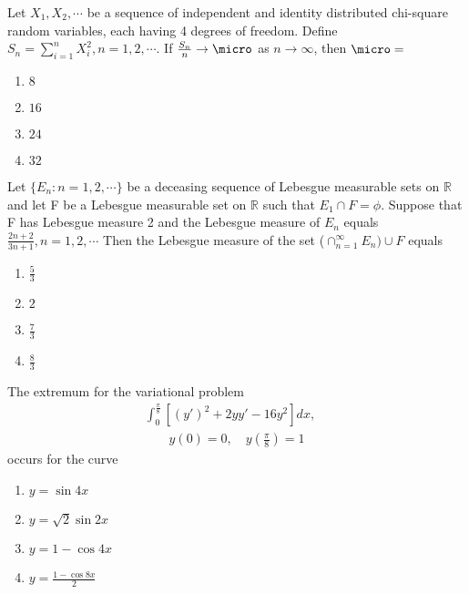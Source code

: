 \item Let $X_1,X_2,\cdots$ be a sequence of independent and identity distributed chi-square random variables, each having 4 degrees of freedom. Define $S_n=\sum_{i=1}^{n}X_i^{2},n=1,2,\cdots$. If $\frac{S_n}{n}\rightarrow \micro$ as $n\rightarrow \infty$, then $\micro=$
\begin{multicols}{2}
    \begin{enumerate}
  \item $8$
  \item $16$
  \item $24$
  \item $32$
\end{enumerate}
\end{multicols}
\item Let $\{E_n:n=1,2,\cdots\}$ be a deceasing sequence of Lebesgue measurable sets on $\mathbb{R}$ and let F be a Lebesgue measurable set on $\mathbb{R}$ such that $E_1 \cap F=\phi$. Suppose that F has Lebesgue measure 2 and the Lebesgue measure of $E_n$ equals $\frac{2n+2}{3n+1},n=1,2,\cdots$ Then the Lebesgue measure of the set ($\cap_{n=1}^{\infty}E_n)\cup F$ equals
\begin{multicols}{2}
\begin{enumerate}
  \item $\frac{5}{3}$
    \item $2$
    \item $\frac{7}{3}$
    \item $\frac{8}{3}$
\end{enumerate}    
\end{multicols}
\item The extremum for the variational problem
\begin{align*}
    \int_{0}^{\frac{\pi}{8}} \left[ (y')^2 + 2yy' - 16y^2 \right] dx, \quad 
\end{align*}
\begin{align*}
    y(0)=0,\quad y\left(\frac{\pi}{8}\right)=1
\end{align*}
occurs for the curve
\begin{multicols}{2}
    \begin{enumerate}
        \item $y=\sin{4x}$
        \item $y=\sqrt{2}\sin{2x}$
        \item $y=1-\cos{4x}$
        \item $y=\frac{1-\cos{8x}}{2}$
    \end{enumerate}
\end{multicols}
